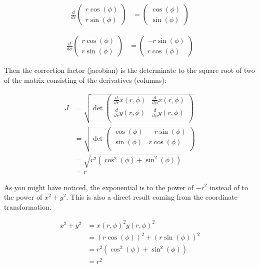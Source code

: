 \documentclass{paper}
\begin{document}
\begin{align}
    \frac{d}{dr} \begin{pmatrix}r \cos(\phi)\\r \sin(\phi)\end{pmatrix} 
    &= \begin{pmatrix} \cos(\phi)\\ \sin(\phi)\end{pmatrix}
\end{align}

\begin{align}
    \frac{d}{d\phi} \begin{pmatrix}r \cos(\phi)\\r \sin(\phi)\end{pmatrix} 
    &= \begin{pmatrix}-r \sin(\phi)\\ r \cos(\phi)\end{pmatrix}
\end{align}

Then the correction factor (jacobian) is the determinate to the square root of two of the matrix consisting of the derivatives (columns):

\begin{align}
J
&=
\sqrt{\det
\begin{pmatrix}
\frac{d}{dr} x(r,\phi) & \frac{d}{d\phi} x(r,\phi) \\
\frac{d}{dr} y(r,\phi) & \frac{d}{d\phi} y(r,\phi) \\
\end{pmatrix}} \\
&= 
\sqrt{\det
\begin{pmatrix}
\cos(\phi) & -r \sin(\phi) \\
\sin(\phi) & r \cos(\phi) \\
\end{pmatrix}} \\
&= \sqrt{r^2(\cos^2(\phi) + \sin^2(\phi))} \\
&= r
\label{eq:jacobian}
\end{align}

As you might have noticed, the exponential is to the power of $-r^2$ instead of to the power of $x^2 + y^2$. This is also a direct result coming from the coordinate transformation.

\begin{align}
    x^2 + y^2 
    &= x(r, \phi)^2 y(r, \phi)^2 \\
    &= (r\cos(\phi))^2+(r \sin(\phi))^2 \\
    &= r^2 (\cos^2(\phi) + \sin^2(\phi)) \\
    &= r^2
\end{align}
\end{document}
